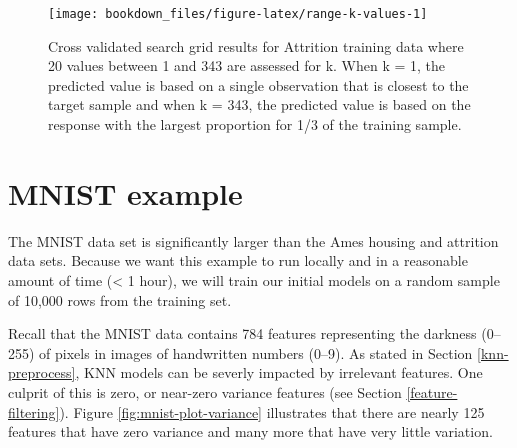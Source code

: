 \documentclass[]{krantz}
\makeatletter
\newenvironment{Shaded}{\begin{snugshade}}{\end{snugshade}}
\newcommand{\DataTypeTok}[1]{\textcolor[rgb]{0.27,0.27,0.27}{#1}}
\newcommand{\DecValTok}[1]{\textcolor[rgb]{0.06,0.06,0.06}{#1}}
\newcommand{\KeywordTok}[1]{\textcolor[rgb]{0.27,0.27,0.27}{\textbf{#1}}}
\newcommand{\NormalTok}[1]{#1}
\newcommand{\OperatorTok}[1]{\textcolor[rgb]{0.43,0.43,0.43}{\textbf{#1}}}
\newcommand{\StringTok}[1]{\textcolor[rgb]{0.5,0.5,0.5}{#1}}
\newenvironment{kframe}{%
\medskip{}
\setlength{\fboxsep}{.8em}
 \def\at@end@of@kframe{}%
 \ifinner\ifhmode%
  \def\at@end@of@kframe{\end{minipage}}%
  \begin{minipage}{\columnwidth}%
 \fi\fi%
 \def\FrameCommand##1{\hskip\@totalleftmargin \hskip-\fboxsep
 \colorbox{shadecolor}{##1}\hskip-\fboxsep
     \hskip-\linewidth \hskip-\@totalleftmargin \hskip\columnwidth}%
 \MakeFramed {\advance\hsize-\width
   \@totalleftmargin\z@ \linewidth\hsize
   \@setminipage}}%
 {\par\unskip\endMakeFramed%
 \at@end@of@kframe}
\renewenvironment{Shaded}{\begin{kframe}}{\end{kframe}}
\makeatother
\begin{document}
\begin{figure}

{\centering \texttt{[image: bookdown\_files/figure-latex/range-k-values-1]} 

}

\caption{Cross validated search grid results for Attrition training data where 20 values between 1 and 343 are assessed for k. When k = 1, the predicted value is based on a single observation that is closest to the target sample and when k = 343, the predicted value is based on the response with the largest proportion for 1/3 of the training sample.}\label{fig:range-k-values}
\end{figure}

\hypertarget{knn-mnist}{%
\section{MNIST example}\label{knn-mnist}}

The MNIST data set is significantly larger than the Ames housing and attrition data sets. Because we want this example to run locally and in a reasonable amount of time (\textless{} 1 hour), we will train our initial models on a random sample of 10,000 rows from the training set.

\begin{Shaded}
\end{Shaded}

Recall that the MNIST data contains 784 features representing the darkness (0--255) of pixels in images of handwritten numbers (0--9). As stated in Section \ref{knn-preprocess}, KNN models can be severly impacted by irrelevant features. One culprit of this is zero, or near-zero variance features (see Section \ref{feature-filtering}). Figure \ref{fig:mnist-plot-variance} illustrates that there are nearly 125 features that have zero variance and many more that have very little variation.
\end{document}
